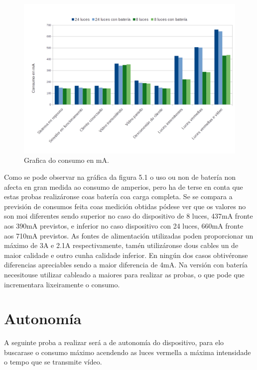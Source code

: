 \begin{figure}[tb]
  \centering
  \includegraphics[scale=.5]{imaxes/grafica-amperaxe.png}
  \caption{Grafica do consumo en mA.}
  \label{f:soporte móbil}
\end{figure}
Como se pode observar na gráfica da figura 5.1 o uso ou non de batería non afecta en gran medida ao consumo de amperios, pero ha de terse en conta que estas probas realizáronse coas batería coa carga completa. Se se compara a previsión de consumos feita coas medición obtidas
pódese ver que os valores no son moi diferentes sendo superior no caso do dispositivo de 8 luces, 437mA fronte aos 390mA previstos, e inferior no caso dispositivo con 24 luces, 660mA fronte aos 710mA previstos.
As fontes de alimentación utilizadas poden proporcionar un máximo de 3A e 2.1A respectivamente, tamén utilizáronse dous cables un de maior calidade e outro cunha calidade inferior. En ningún dos casos obtivéronse diferencias apreciables sendo a maior diferencia de 4mA. Na versión con batería necesitouse utilizar cableado a maiores para realizar as probas, o que pode que incrementara lixeiramente o consumo.

\section{Autonomía}

A seguinte proba a realizar será a de autonomía do dispositivo, para elo buscarase o consumo máximo acendendo as luces vermella a máxima intensidade o tempo que se transmite vídeo.


